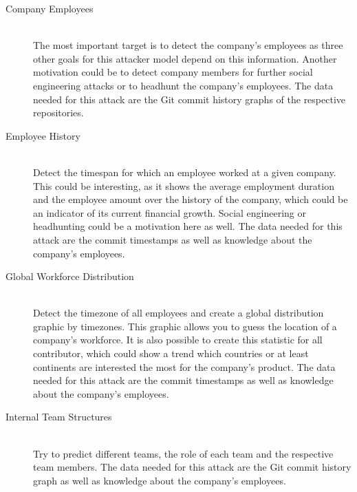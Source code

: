 \begin{description}
    \item[Company Employees] \hfill \\
        The most important target is to detect the company's employees as three other goals for this attacker model depend on this information.
        Another motivation could be to detect company members for further social engineering attacks or to headhunt the company's employees.
        The data needed for this attack are the Git commit history graphs of the respective repositories.

    \item[Employee History] \hfill \\
        Detect the timespan for which an employee worked at a given company.
        This could be interesting, as it shows the average employment duration and the employee amount over the history of the company, which could be an indicator of its current financial growth.
        Social engineering or headhunting could be a motivation here as well.
        The data needed for this attack are the commit timestamps as well as knowledge about the company's employees.

    \item[Global Workforce Distribution] \hfill \\
        Detect the timezone of all employees and create a global distribution graphic by timezones.
        This graphic allows you to guess the location of a company's workforce.
        It is also possible to create this statistic for all contributor, which could show a trend which countries or at least continents are interested the most for the company's product.
        The data needed for this attack are the commit timestamps as well as knowledge about the company's employees.

    \item[Internal Team Structures] \hfill \\
        Try to predict different teams, the role of each team and the respective team members.
        The data needed for this attack are the Git commit history graph as well as knowledge about the company's employees.
\end{description}
